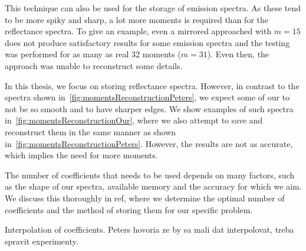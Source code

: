 This technique can also be used for the storage of emission spectra. As these tend to be more spiky and sharp, a lot more moments is required than for the reflectance spectra. To give an example, even a mirrored approached with $m=15$ does not produce satisfactory results for some emission spectra and the testing was performed for as many as real 32 moments ($m=31$). Even then, the approach was unable to reconstruct some details.

In this thesis, we focus on storing reflectance spectra. However, in contrast to the spectra shown in~\cref{fig:momentsReconstructionPeters}, we expect some of our to not be so smooth and to have sharper edges. We show examples of such spectra in~\cref{fig:momentsReconstructionOur}, where we also attempt to save and reconstruct them in the same manner as shown in~\cref{fig:momentsReconstructionPeters}. However, the results are not as accurate, which implies the need for more moments.

The number of coefficients that needs to be used depends on many factors, such as the shape of our spectra, available memory and the accuracy for which we aim. We discuss this thoroughly in ref, where we determine the optimal number of coefficients and the method of storing them for our specific problem.

Interpolation of coefficients. Peters hovoria ze by sa mali dat interpolovat, treba spravit experimenty.

